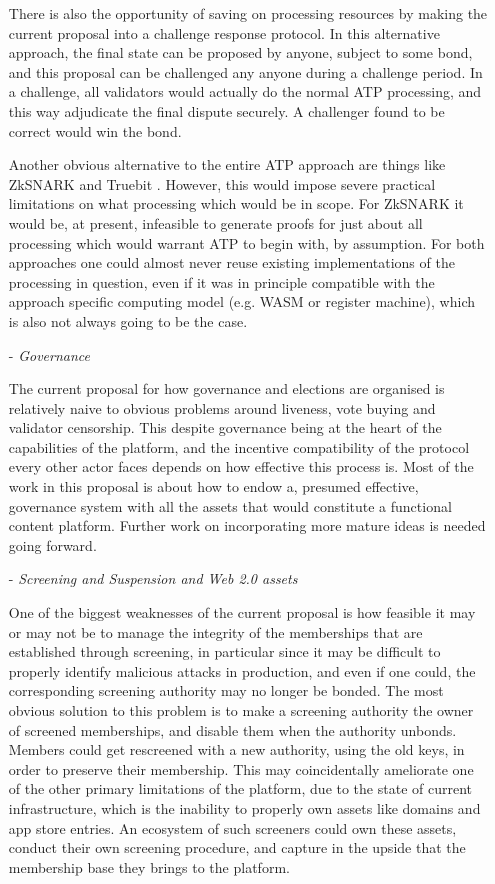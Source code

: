 \documentclass{article}
\begin{document}
\begin{itemize}
    There is also the opportunity of saving on processing resources by making the current proposal into a challenge response protocol. In this alternative approach, the final state can be proposed by anyone, subject to some bond, and this proposal can be challenged any anyone during a challenge period. In a challenge, all validators would actually do the normal ATP processing, and this way adjudicate the final dispute securely. A challenger found to be correct would win the bond.

    Another obvious alternative to the entire ATP approach are things like ZkSNARK \cite{ben2014succinct} and Truebit \cite{teutsch2017scalable}. However, this would impose severe practical limitations on what processing which would be in scope. For ZkSNARK it would be, at present, infeasible to generate proofs for just about all processing which would warrant ATP to begin with, by assumption. For both approaches one could almost never reuse existing implementations of the processing in question, even if it was in principle compatible with the approach specific computing model (e.g. WASM or register machine), which is also not always going to be the case.

    \item[-] \textit{Governance}

    The current proposal for how governance and elections are organised is relatively naive to obvious problems around liveness, vote buying and validator censorship. This despite governance being at the heart of the capabilities of the platform, and the incentive compatibility of the protocol every other actor faces depends on how effective this process is. Most of the work in this proposal is about how to endow a, presumed effective, governance system with all the assets that would constitute a functional content platform. Further work on incorporating more mature ideas is needed going forward.

    \item[-] \textit{Screening and Suspension and Web 2.0 assets}

    One of the biggest weaknesses of the current proposal is how feasible it may or may not be to manage the integrity of the memberships that are established through screening, in particular since it may be difficult to properly identify malicious attacks in production, and even if one could, the corresponding screening authority may no longer be bonded. The most obvious solution to this problem is to make a screening authority the owner of screened memberships, and disable them when the authority unbonds. Members could get rescreened with a new authority, using the old keys, in order to preserve their membership. This may coincidentally ameliorate one of the other primary limitations of the platform, due to the state of current infrastructure, which is the inability to properly own assets like domains and app store entries. An ecosystem of such screeners could own these assets, conduct their own screening procedure, and capture in the upside that the membership base they brings to the platform.


\end{itemize}
\end{document}
